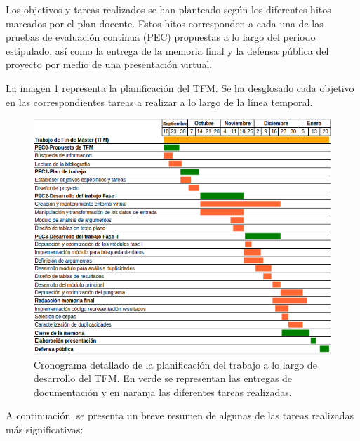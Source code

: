 
Los objetivos y tareas realizados se han planteado según los diferentes hitos marcados por el plan docente. Estos hitos corresponden a cada una de las pruebas de evaluación continua (PEC) propuestas a lo largo del periodo estipulado, así como la entrega de la memoria final y la defensa pública del proyecto por medio de una presentación virtual.

La imagen \ref{fig:crono} representa la planificación del TFM. Se ha desglosado cada objetivo en las correspondientes tareas a realizar a lo largo de la línea temporal.

\begin{figure}[h]
	\centering
	\captionsetup{width=0.7\linewidth} 
	\includegraphics[width=0.7\linewidth]{figs/cronograma.png}
	\caption[Cronograma]{Cronograma detallado de la planificación del trabajo a lo largo de desarrollo del TFM. En verde se representan las entregas de documentación y en naranja las diferentes tareas realizadas.}
	\label{fig:crono}
\end{figure}
A continuación, se presenta un breve resumen de algunas de las tareas realizadas más significativas:

